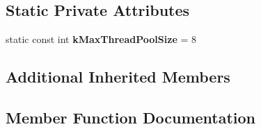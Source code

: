 \subsection*{Static Private Attributes}
\begin{DoxyCompactItemize}
\item 
static const int {\bfseries k\+Max\+Thread\+Pool\+Size} = 8\hypertarget{classv8_1_1platform_1_1_default_platform_ac7fb485044209ec87f8d53d9be9b1a7e}{}\label{classv8_1_1platform_1_1_default_platform_ac7fb485044209ec87f8d53d9be9b1a7e}

\end{DoxyCompactItemize}
\subsection*{Additional Inherited Members}


\subsection{Member Function Documentation}
